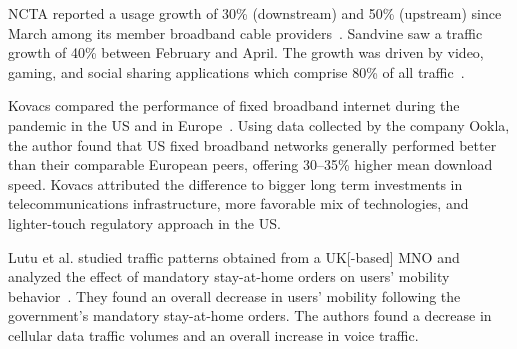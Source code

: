 \documentclass[conference,10pt]{IEEEtran}
\begin{document}
NCTA reported a usage growth of 30\% (downstream) and 50\% (upstream) since March among its member broadband cable providers~\cite{ncta}. Sandvine saw a traffic growth of 40\% between February and April. The growth was driven by video, gaming, and social sharing applications which comprise 80\% of all traffic~\cite{sandvine}.

Kovacs compared the performance of fixed broadband internet during the pandemic in the \gls{US} and in Europe~\cite{kovacs}. Using data collected by the company Ookla, the author found that \gls{US} fixed broadband networks generally performed better than their comparable European peers, offering 30--35\% higher mean download speed. Kovacs attributed the difference to bigger long term investments in telecommunications infrastructure, more favorable mix of technologies, and lighter-touch regulatory approach in the \gls{US}.



Lutu et al. studied traffic patterns obtained from a \gls{UK}[-based] \gls{MNO} and analyzed the effect of mandatory stay-at-home orders on users' mobility behavior~\cite{lutu2020characterization}. They found an overall decrease in users' mobility following the government’s mandatory stay-at-home orders. The authors found a decrease in cellular data traffic volumes and an overall increase in voice traffic.
\end{document}
